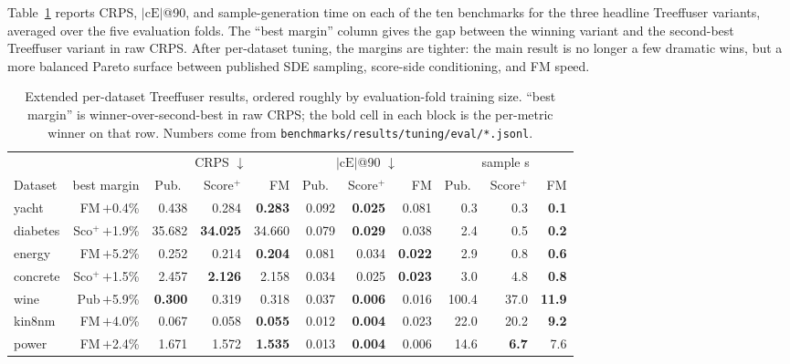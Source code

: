 \documentclass{uai2026}
\begin{document}
Table~\ref{tab:perdata-ext} reports CRPS, $|\text{cE}|$@90, and sample-generation time on each of the ten benchmarks for the three headline Treeffuser variants, averaged over the five evaluation folds. The ``best margin'' column gives the gap between the winning variant and the second-best Treeffuser variant in raw CRPS. After per-dataset tuning, the margins are tighter: the main result is no longer a few dramatic wins, but a more balanced Pareto surface between published SDE sampling, score-side conditioning, and FM speed.

\begin{table}[!h]
  \centering
  \caption{Extended per-dataset Treeffuser results, ordered roughly by evaluation-fold training size. ``best margin'' is winner-over-second-best in raw CRPS; the bold cell in each block is the per-metric winner on that row. Numbers come from \texttt{benchmarks/results/tuning/eval/*.jsonl}.}\label{tab:perdata-ext}
  \scriptsize
  \begin{tabular}{lrrrrrrrrrr}
    \toprule
    & & \multicolumn{3}{c}{CRPS $\downarrow$} & \multicolumn{3}{c}{$|\text{cE}|$@90 $\downarrow$} & \multicolumn{3}{c}{sample s} \\
    \cmidrule(lr){3-5} \cmidrule(lr){6-8} \cmidrule(lr){9-11}
    Dataset & best margin & Pub.\ & Score$^+$ & FM & Pub.\ & Score$^+$ & FM & Pub.\ & Score$^+$ & FM \\
    \midrule
    yacht              & FM\,$+$0.4\%      & 0.438 & 0.284 & \textbf{0.283} & 0.092 & \textbf{0.025} & 0.081 & 0.3 & 0.3 & \textbf{0.1} \\
    diabetes           & Sco$^+$\,$+$1.9\% & 35.682 & \textbf{34.025} & 34.660 & 0.079 & \textbf{0.029} & 0.038 & 2.4 & 0.5 & \textbf{0.2} \\
    energy             & FM\,$+$5.2\%      & 0.252 & 0.214 & \textbf{0.204} & 0.081 & 0.034 & \textbf{0.022} & 2.9 & 0.8 & \textbf{0.6} \\
    concrete           & Sco$^+$\,$+$1.5\% & 2.457 & \textbf{2.126} & 2.158 & 0.034 & 0.025 & \textbf{0.023} & 3.0 & 4.8 & \textbf{0.8} \\
    wine               & Pub\,$+$5.9\%     & \textbf{0.300} & 0.319 & 0.318 & 0.037 & \textbf{0.006} & 0.016 & 100.4 & 37.0 & \textbf{11.9} \\
    kin8nm             & FM\,$+$4.0\%      & 0.067 & 0.058 & \textbf{0.055} & 0.012 & \textbf{0.004} & 0.023 & 22.0 & 20.2 & \textbf{9.2} \\
    power              & FM\,$+$2.4\%      & 1.671 & 1.572 & \textbf{1.535} & 0.013 & \textbf{0.004} & 0.006 & 14.6 & \textbf{6.7} & 7.6 \\

\end{tabular}
\end{table}
\end{document}

